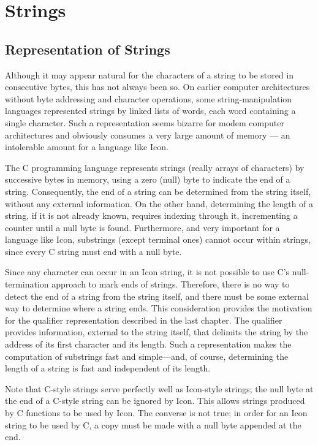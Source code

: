 \section{Strings}
\subsection{Representation of Strings}

Although it may appear natural for the characters of a string to be
stored in consecutive bytes, this has not always been so. On earlier
computer architectures without byte addressing and character
operations, some string-manipulation languages represented strings by
linked lists of words, each word containing a single character. Such a
representation seems bizarre for modem computer architectures and
obviously consumes a very large amount of memory --- an intolerable amount
for a language like Icon.

The C programming language represents strings (really arrays of
characters) by successive bytes in memory, using a zero (null) byte to
indicate the end of a string. Consequently, the end of a string can be
determined from the string itself, without any external
information. On the other hand, determining the length of a string, if
it is not already known, requires indexing through it, incrementing a
counter until a null byte is found. Furthermore, and very important
for a language like Icon, substrings (except terminal ones) cannot
occur within strings, since every C string must end with a null byte.

Since any character can occur in an Icon string, it is not possible to
use C's null-termination approach to mark ends of strings. Therefore,
there is no way to detect the end of a string from the string itself,
and there must be some external way to determine where a string
ends. This consideration provides the motivation for the qualifier
representation described in the last chapter. The qualifier provides
information, external to the string itself, that delimits the string
by the address of its first character and its length. Such a
representation makes the computation of substrings fast and
simple{---}and, of course, determining the length of a string is
fast and independent of its length.

Note that C-style strings serve perfectly well as Icon-style strings;
the null byte at the end of a C-style string can be ignored by
Icon. This allows strings produced by C functions to be used by
Icon. The converse is not true; in order for an Icon string to be used
by C, a copy must be made with a null byte appended at the end.

